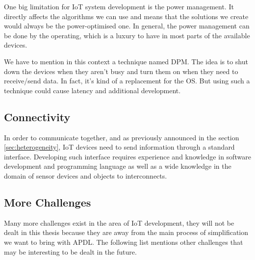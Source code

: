One big limitation for \gls{IoT} system development is the power management. It
directly affects the algorithms we can use and means that the solutions we
create would always be the power-optimised one\cite{Sneps-Sneppe2016}. In
general, the power management can be done by the operating, which is a luxury
to have in most parts of the available devices.

We have to mention in this context a technique named \gls{DPM}. The idea is to
shut down the devices when they aren't busy and turn them on when they
need to receive/send data. In fact, it's kind of a replacement for the
\gls{OS}. But using such a technique could cause latency and additional development.

\subsection{Connectivity}
\label{sec:connectivity}

In order to communicate together, and as previously announced in the section \ref{sec:heterogeneity}, \gls{IoT} devices need to send information through
a standard interface. Developing such interface requires experience and knowledge
in software development and programming language as well as a wide knowledge in
the domain of sensor devices and objects to interconnects. \cite{midgar}

\subsection{More Challenges}
\label{sec:more_challenges}

Many more challenges exist in the area of \gls{IoT} development, they will not be dealt
in this thesis because they are away from the main process
of simplification we want to bring with \gls{APDL}. The following list mentions
other challenges that may be interesting to be dealt in the future. 

